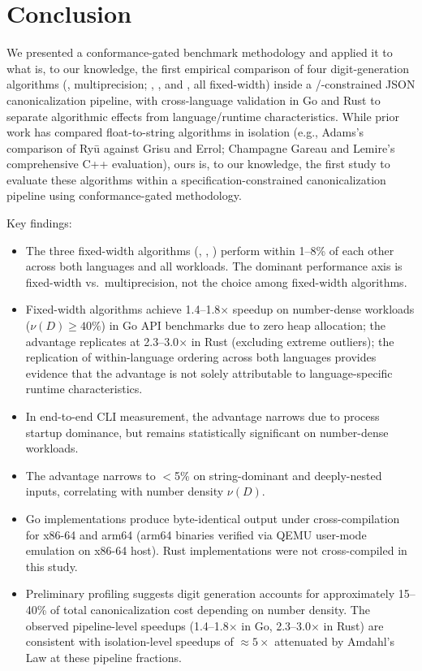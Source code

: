 \section{Conclusion}
\label{sec:conclusion}

We presented a conformance-gated benchmark methodology and applied it to
what is, to our knowledge, the first empirical comparison of four
digit-generation algorithms (\burgerdybvig, multiprecision; \schubfach,
\ryualg, and \dragonbox, all fixed-width) inside a
\rfcjcs/\ecma-constrained JSON canonicalization pipeline, with
cross-language validation in Go and Rust to separate algorithmic effects
from language/runtime characteristics.  While prior work has compared
float-to-string algorithms in isolation (e.g., Adams's comparison of
Ry\=u against Grisu and Errol; Champagne Gareau and Lemire's
comprehensive C++ evaluation), ours is, to our knowledge, the first
study to evaluate these algorithms within a specification-constrained
canonicalization pipeline using conformance-gated methodology.

Key findings:
\begin{itemize}
\item The three fixed-width algorithms (\schubfach, \ryualg, \dragonbox)
      perform within 1--8\% of each other across both languages and all
      workloads.  The dominant performance axis is fixed-width vs.\
      multiprecision, not the choice among fixed-width algorithms.
\item Fixed-width algorithms achieve 1.4--1.8$\times$ speedup on
      number-dense workloads ($\nu(D) \geq 40\%$) in Go API benchmarks
      due to zero heap allocation; the advantage replicates at
      2.3--3.0$\times$ in Rust (excluding extreme outliers); the
      replication of within-language ordering across both languages
      provides evidence that the advantage is not solely attributable
      to language-specific runtime characteristics.
\item In end-to-end CLI measurement, the advantage narrows due to
      process startup dominance, but remains statistically significant
      on number-dense workloads.
\item The advantage narrows to $<$5\% on string-dominant and
      deeply-nested inputs, correlating with number density $\nu(D)$.
\item Go implementations produce byte-identical output under
      cross-compilation for x86-64 and arm64 (arm64 binaries verified
      via QEMU user-mode emulation on x86-64 host).  Rust
      implementations were not cross-compiled in this study.
\item Preliminary profiling suggests digit generation accounts for
      approximately 15--40\% of total canonicalization cost depending
      on number density. The observed pipeline-level speedups
      (1.4--1.8$\times$ in Go, 2.3--3.0$\times$ in Rust) are consistent
      with isolation-level speedups of ${\approx}5\times$ attenuated by
      Amdahl's Law at these pipeline fractions.
\end{itemize}

